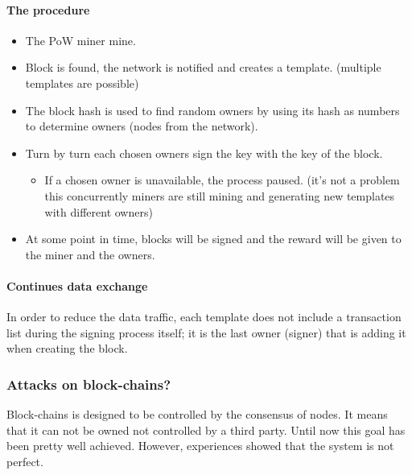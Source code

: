 \paragraph{The procedure}
\begin{itemize}
\item The PoW miner mine.
\item Block is found, the network is notified and creates a template. (multiple templates are possible)
\item The block hash is used to find random owners by using its hash as numbers to determine owners (nodes from the network).
\item Turn by turn each chosen owners sign the key with the key of the block.
\begin{itemize}
\item If a chosen owner is unavailable, the process paused. (it's not a problem this concurrently miners are still mining and generating new templates with different owners)
\end{itemize}
\item At some point in time, blocks will be signed and the reward will be given to the miner and the owners.
\end{itemize}

\paragraph{Continues data exchange}
In order to reduce the data traffic, each template does not include a transaction list during the signing process itself; it is the last owner (signer) that is adding it when creating the block.

\subsubsection{Attacks on block-chains?}
Block-chains is designed to be controlled by the consensus of nodes. It means that it can not be owned not controlled by a third party. Until now this goal has been pretty well achieved. However, experiences showed that the system is not perfect.

